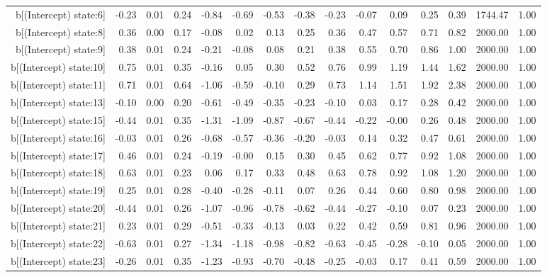 \begin{table}[ht]
\begin{tabular}{rrrrrrrrrrrrrrr}
  b[(Intercept) state:6] & -0.23 & 0.01 & 0.24 & -0.84 & -0.69 & -0.53 & -0.38 & -0.23 & -0.07 & 0.09 & 0.25 & 0.39 & 1744.47 & 1.00 \\ 
  b[(Intercept) state:8] & 0.36 & 0.00 & 0.17 & -0.08 & 0.02 & 0.13 & 0.25 & 0.36 & 0.47 & 0.57 & 0.71 & 0.82 & 2000.00 & 1.00 \\ 
  b[(Intercept) state:9] & 0.38 & 0.01 & 0.24 & -0.21 & -0.08 & 0.08 & 0.21 & 0.38 & 0.55 & 0.70 & 0.86 & 1.00 & 2000.00 & 1.00 \\ 
  b[(Intercept) state:10] & 0.75 & 0.01 & 0.35 & -0.16 & 0.05 & 0.30 & 0.52 & 0.76 & 0.99 & 1.19 & 1.44 & 1.62 & 2000.00 & 1.00 \\ 
  b[(Intercept) state:11] & 0.71 & 0.01 & 0.64 & -1.06 & -0.59 & -0.10 & 0.29 & 0.73 & 1.14 & 1.51 & 1.92 & 2.38 & 2000.00 & 1.00 \\ 
  b[(Intercept) state:13] & -0.10 & 0.00 & 0.20 & -0.61 & -0.49 & -0.35 & -0.23 & -0.10 & 0.03 & 0.17 & 0.28 & 0.42 & 2000.00 & 1.00 \\ 
  b[(Intercept) state:15] & -0.44 & 0.01 & 0.35 & -1.31 & -1.09 & -0.87 & -0.67 & -0.44 & -0.22 & -0.00 & 0.26 & 0.48 & 2000.00 & 1.00 \\ 
  b[(Intercept) state:16] & -0.03 & 0.01 & 0.26 & -0.68 & -0.57 & -0.36 & -0.20 & -0.03 & 0.14 & 0.32 & 0.47 & 0.61 & 2000.00 & 1.00 \\ 
  b[(Intercept) state:17] & 0.46 & 0.01 & 0.24 & -0.19 & -0.00 & 0.15 & 0.30 & 0.45 & 0.62 & 0.77 & 0.92 & 1.08 & 2000.00 & 1.00 \\ 
  b[(Intercept) state:18] & 0.63 & 0.01 & 0.23 & 0.06 & 0.17 & 0.33 & 0.48 & 0.63 & 0.78 & 0.92 & 1.08 & 1.20 & 2000.00 & 1.00 \\ 
  b[(Intercept) state:19] & 0.25 & 0.01 & 0.28 & -0.40 & -0.28 & -0.11 & 0.07 & 0.26 & 0.44 & 0.60 & 0.80 & 0.98 & 2000.00 & 1.00 \\ 
  b[(Intercept) state:20] & -0.44 & 0.01 & 0.26 & -1.07 & -0.96 & -0.78 & -0.62 & -0.44 & -0.27 & -0.10 & 0.07 & 0.23 & 2000.00 & 1.00 \\ 
  b[(Intercept) state:21] & 0.23 & 0.01 & 0.29 & -0.51 & -0.33 & -0.13 & 0.03 & 0.22 & 0.42 & 0.59 & 0.81 & 0.96 & 2000.00 & 1.00 \\ 
  b[(Intercept) state:22] & -0.63 & 0.01 & 0.27 & -1.34 & -1.18 & -0.98 & -0.82 & -0.63 & -0.45 & -0.28 & -0.10 & 0.05 & 2000.00 & 1.00 \\ 
  b[(Intercept) state:23] & -0.26 & 0.01 & 0.35 & -1.23 & -0.93 & -0.70 & -0.48 & -0.25 & -0.03 & 0.17 & 0.41 & 0.59 & 2000.00 & 1.00 \\ 

\end{tabular}
\end{table}
